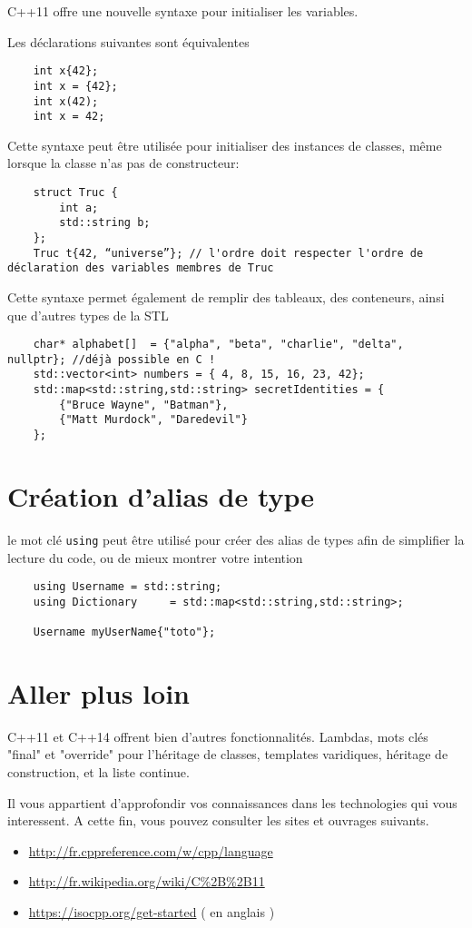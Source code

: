 \documentclass[8pt]{article}
\begin{document}
C++11 offre une nouvelle syntaxe pour initialiser les variables.

Les déclarations suivantes sont équivalentes
\begin{lstlisting}
	int x{42};
	int x = {42};
	int x(42);
	int x = 42;
\end{lstlisting}

Cette syntaxe peut être utilisée pour initialiser des instances de classes, même lorsque la classe n’as pas de constructeur:

\begin{lstlisting}
	struct Truc {
		int a;
		std::string b;
	};
	Truc t{42, “universe”}; // l'ordre doit respecter l'ordre de déclaration des variables membres de Truc
\end{lstlisting}

Cette syntaxe permet également de remplir des tableaux, des conteneurs, ainsi que d'autres types de la STL

\begin{lstlisting}
    char* alphabet[]  = {"alpha", "beta", "charlie", "delta", nullptr}; //déjà possible en C !
	std::vector<int> numbers = { 4, 8, 15, 16, 23, 42};
	std::map<std::string,std::string> secretIdentities = { 
		{"Bruce Wayne", "Batman"}, 
		{"Matt Murdock", "Daredevil"}
    };
\end{lstlisting}

\section*{Création d'alias de type}

le mot clé \lstinline{using} peut être utilisé pour créer des alias de types afin de simplifier la lecture du code, ou de mieux montrer votre intention

\begin{lstlisting}
	using Username = std::string;
	using Dictionary     = std::map<std::string,std::string>;
	
	Username myUserName{"toto"};
\end{lstlisting}

\section*{Aller plus loin}

C++11 et C++14 offrent bien d'autres fonctionnalités. Lambdas, mots clés "final" et "override" pour l'héritage de classes, templates varidiques, héritage de construction, et la liste continue.

Il vous appartient d'approfondir vos connaissances dans les technologies qui vous interessent.
A cette fin, vous pouvez consulter les sites et ouvrages suivants.

\begin{itemize}
\item \url{http://fr.cppreference.com/w/cpp/language}
\item \url{http://fr.wikipedia.org/wiki/C%2B%2B11}
\item \url{https://isocpp.org/get-started} ( en anglais )
\end{itemize}




\nocite{*}

\end{document}
